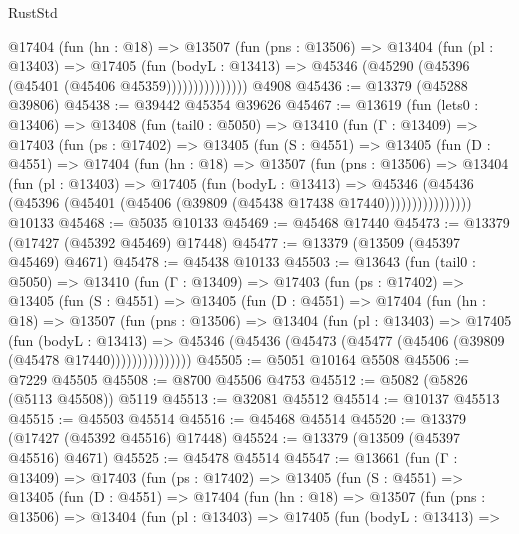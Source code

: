 \begin{lexlean}{RustStd}
\begin{coremodule}
                @17404
                  (fun (hn : @18) =>
                  @13507
                    (fun (pns : @13506) =>
                    @13404
                      (fun (pl : @13403) =>
                      @17405
                        (fun (bodyL : @13413) =>
                        @45346 (@45290 (@45396 (@45401 (@45406 @45359)))))))))))))))
    @4908
@45436 := @13379 (@45288 @39806)
@45438 := @39442 @45354 @39626
@45467 := @13619
    (fun (lets0 : @13406) =>
    @13408
      (fun (tail0 : @5050) =>
      @13410
        (fun (Γ : @13409) =>
        @17403
          (fun (ps : @17402) =>
          @13405
            (fun (S : @4551) =>
            @13405
              (fun (D : @4551) =>
              @17404
                (fun (hn : @18) =>
                @13507
                  (fun (pns : @13506) =>
                  @13404
                    (fun (pl : @13403) =>
                    @17405
                      (fun (bodyL : @13413) =>
                      @45346
                        (@45436
                          (@45396 (@45401 (@45406 (@39809 (@45438 @17438 @17440))))))))))))))))
    @10133
@45468 := @5035 @10133
@45469 := @45468 @17440
@45473 := @13379 (@17427 (@45392 @45469) @17448)
@45477 := @13379 (@13509 (@45397 @45469) @4671)
@45478 := @45438 @10133
@45503 := @13643
    (fun (tail0 : @5050) =>
    @13410
      (fun (Γ : @13409) =>
      @17403
        (fun (ps : @17402) =>
        @13405
          (fun (S : @4551) =>
          @13405
            (fun (D : @4551) =>
            @17404
              (fun (hn : @18) =>
              @13507
                (fun (pns : @13506) =>
                @13404
                  (fun (pl : @13403) =>
                  @17405
                    (fun (bodyL : @13413) =>
                    @45346 (@45436 (@45473 (@45477 (@45406 (@39809 (@45478 @17440)))))))))))))))
@45505 := @5051 @10164 @5508
@45506 := @7229 @45505
@45508 := @8700 @45506 @4753
@45512 := @5082 (@5826 (@5113 @45508)) @5119
@45513 := @32081 @45512
@45514 := @10137 @45513
@45515 := @45503 @45514
@45516 := @45468 @45514
@45520 := @13379 (@17427 (@45392 @45516) @17448)
@45524 := @13379 (@13509 (@45397 @45516) @4671)
@45525 := @45478 @45514
@45547 := @13661
    (fun (Γ : @13409) =>
    @17403
      (fun (ps : @17402) =>
      @13405
        (fun (S : @4551) =>
        @13405
          (fun (D : @4551) =>
          @17404
            (fun (hn : @18) =>
            @13507
              (fun (pns : @13506) =>
              @13404
                (fun (pl : @13403) =>
                @17405
                  (fun (bodyL : @13413) =>

\end{coremodule}
\end{lexlean}

